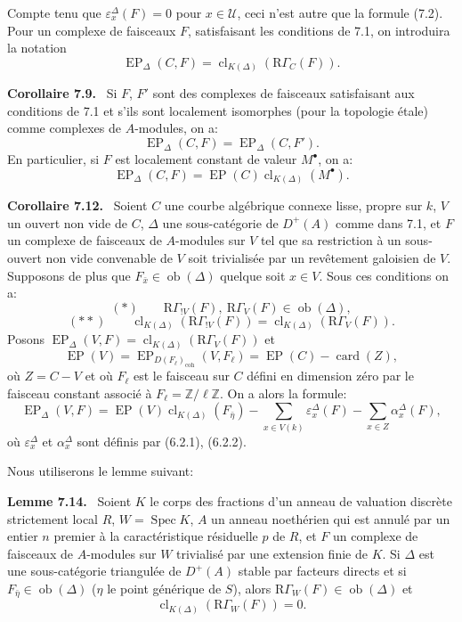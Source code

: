 \documentclass[11pt]{article}
\newenvironment{statement}[1]{\par\medskip\noindent\textbf{#1.}\ }{\par\medskip}
\DeclareMathOperator{\Spec}{Spec}
\providecommand{\EP}{\operatorname{EP}}
\providecommand{\coh}{\mathrm{coh}}
\providecommand{\Ob}{\operatorname{ob}}
\providecommand{\Ob}{\operatorname{ob}}
\providecommand{\Spec}{\operatorname{Spec}}
\providecommand{\EP}{\operatorname{EP}}
\providecommand{\Spec}{\operatorname{Spec}}
\providecommand{\Ob}{\operatorname{Ob}}
\providecommand{\coh}{\mathrm{coh}}
\providecommand{\clK}[1]{\operatorname{cl}_{K(#1)}}
\providecommand{\RG}{\mathrm R\Gamma}
\providecommand{\Spec}{\operatorname{Spec}}
\providecommand{\Ob}{\operatorname{ob}}
\providecommand{\Spec}{\operatorname{Spec}}
\providecommand{\Ob}{\operatorname{Ob}}
\begin{document}
Compte tenu que $\varepsilon_x^\Delta(F)=0$ pour $x\in\mathcal U$, ceci n'est autre que la formule (7.2). Pour un complexe de faisceaux $F$, satisfaisant les conditions de 7.1, on introduira la notation
\[
\EP_\Delta(C,F)=\clK{\Delta}(\RG_C(F)).
\]

\begin{statement}{Corollaire 7.9}
Si $F$, $F'$ sont des complexes de faisceaux satisfaisant aux conditions de 7.1 et s'ils sont localement isomorphes (pour la topologie étale) comme complexes de $A$-modules, on a:
\[
\EP_\Delta(C,F)=\EP_\Delta(C,F').
\tag{7.10}
\]
En particulier, si $F$ est localement constant de valeur $M^\bullet$, on a:
\[
\EP_\Delta(C,F)=\EP(C)\clK{\Delta}(M^\bullet).
\tag{7.11}
\]
\end{statement}

\begin{statement}{Corollaire 7.12}
Soient $C$ une courbe algébrique connexe lisse, propre sur $k$, $V$ un ouvert non vide de $C$, $\Delta$ une sous-catégorie de $D^+(A)$ comme dans 7.1, et $F$ un complexe de faisceaux de $A$-modules sur $V$ tel que sa restriction à un sous-ouvert non vide convenable de $V$ soit trivialisée par un revêtement galoisien de $V$. Supposons de plus que $F_{\bar x}\in\Ob(\Delta)$ quelque soit $x\in V$. Sous ces conditions on a:
\[
(*)\qquad \RG_{!V}(F),\ \RG_V(F)\in\Ob(\Delta),
\]
\[
(**)\qquad
\clK{\Delta}(\RG_{!V}(F))=\clK{\Delta}(\RG_V(F)).
\]
Posons $\EP_\Delta(V,F)=\clK{\Delta}(\RG_V(F))$ et
\[
\EP(V)=\EP_{D(F_\ell)_{\coh}}(V,F_\ell)=\EP(C)-\operatorname{card}(Z),
\]
où $Z=C-V$ et où $F_\ell$ est le faisceau sur $C$ défini en dimension zéro par le faisceau constant associé à $F_\ell=\mathbb Z/\ell\mathbb Z$. On a alors la formule:
\[
\EP_\Delta(V,F)
=
\EP(V)\clK{\Delta}(F_{\bar\eta})
-\sum_{x\in V(k)}\varepsilon_x^\Delta(F)
-\sum_{x\in Z}\alpha_x^\Delta(F),
\tag{7.13}
\]
où $\varepsilon_x^\Delta$ et $\alpha_x^\Delta$ sont définis par (6.2.1), (6.2.2).
\end{statement}

Nous utiliserons le lemme suivant:

\begin{statement}{Lemme 7.14}
Soient $K$ le corps des fractions d'un anneau de valuation discrète strictement local $R$, $W=\Spec K$, $A$ un anneau noethérien qui est annulé par un entier $n$ premier à la caractéristique résiduelle $p$ de $R$, et $F$ un complexe de faisceaux de $A$-modules sur $W$ trivialisé par une extension finie de $K$. Si $\Delta$ est une sous-catégorie triangulée de $D^+(A)$ stable par facteurs directs et si $F_{\bar\eta}\in\Ob(\Delta)$ ($\eta$ le point générique de $S$), alors $\RG_W(F)\in\Ob(\Delta)$ et
\[
\clK{\Delta}(\RG_W(F))=0.
\]
\end{statement}
\end{document}

